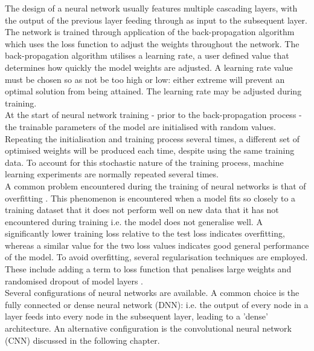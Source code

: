 \noindent
The design of a neural network usually features multiple cascading layers, with the output of the previous layer feeding through as input to the subsequent layer. The network is trained through application of the back-propagation algorithm \cite{hecht1992theory} which uses the loss function to adjust the weights throughout the network. The back-propagation algorithm utilises a learning rate, a user defined value that determines how quickly the model weights are adjusted. A learning rate value must be chosen so as not be too high or low: either extreme will prevent an optimal solution from being attained. The learning rate may be adjusted during training. 
\\

\noindent
At the start of neural network training - prior to the back-propagation process - the trainable parameters of the model are initialised with random values. Repeating the initialisation and training process several times, a different set of optimised weights will be produced each time, despite using the same training data. To account for this stochastic nature of the training process, machine learning experiments are normally repeated several times.
\\

\noindent
A common problem encountered during the training of neural networks is that of overfitting \cite{hawkins2004problem}. This phenomenon is encountered when a model fits so closely to a training dataset that it does not perform well on new data that it has not encountered during training i.e. the model does not generalise well. A significantly lower training loss relative to the test loss indicates overfitting, whereas a similar value for the two loss values indicates good general performance of the model. To avoid overfitting, several regularisation techniques are employed. These include adding a term to loss function that penalises large weights and randomised dropout of model layers \cite{srivastava2014dropout}. 
\\

\noindent
Several configurations of neural networks are available. A common choice is the fully connected or dense neural network (DNN): i.e. the output of every node in a layer feeds into every node in the subsequent layer, leading to a 'dense' architecture. An alternative configuration is the convolutional neural network (CNN) discussed in the following chapter. 

